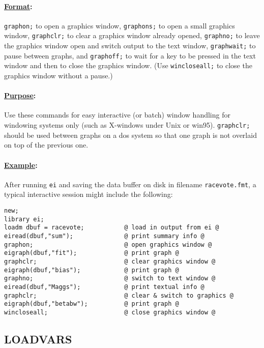 \documentclass[11pt,titlepage]{article}
\begin{document}
\paragraph{\underline{Format}:}
\texttt{graphon;} to open a graphics window, \texttt{graphons;} to
open a small graphics window, \texttt{graphclr;} to clear a graphics
window already opened, \texttt{graphno;} to leave the graphics window
open and switch output to the text window, \texttt{graphwait;} to
pause between graphs, and \texttt{graphoff;} to wait for a key to be
pressed in the text window and then to close the graphics window.
(Use \texttt{wincloseall;} to close the graphics window without a
pause.)

\paragraph{\underline{Purpose}:} Use these commands for easy
interactive (or batch) window handling for windowing systems only
(such as X-windows under Unix or win95).  \texttt{graphclr;} should be
used between graphs on a dos system so that one graph is not overlaid
on top of the previous one.

\paragraph{\underline{Example}:} After running \texttt{ei} and
saving the data buffer on disk in filename \texttt{racevote.fmt}, a
typical interactive session might include the following:
\begin{verbatim}
new;
library ei;
loadm dbuf = racevote;           @ load in output from ei @
eiread(dbuf,"sum");              @ print summary info @
graphon;                         @ open graphics window @
eigraph(dbuf,"fit");             @ print graph @
graphclr;                        @ clear graphics window @
eigraph(dbuf,"bias");            @ print graph @
graphno;                         @ switch to text window @
eiread(dbuf,"Maggs");            @ print textual info @
graphclr;                        @ clear & switch to graphics @
eigraph(dbuf,"betabw");          @ print graph @
wincloseall;                     @ close graphics window @
\end{verbatim}

\subsection{LOADVARS}  \label{loadvars}
\end{document}
